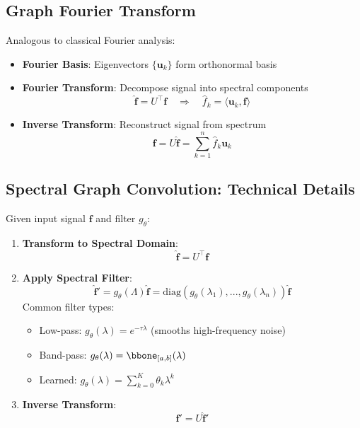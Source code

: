 \begin{notechapter}
\subsection{Graph Fourier Transform}
Analogous to classical Fourier analysis:
\begin{itemize}
    \item \textbf{Fourier Basis}: Eigenvectors $\{\mathbf{u}_k\}$ form 
        orthonormal basis
    \item \textbf{Fourier Transform}: Decompose signal into spectral components
        \[
        \hat{\mathbf{f}} = U^\top \mathbf{f} \quad \Rightarrow \quad 
        \hat{f}_k = \langle \mathbf{u}_k, \mathbf{f} \rangle
        \]
    \item \textbf{Inverse Transform}: Reconstruct signal from spectrum
        \[
        \mathbf{f} = U\hat{\mathbf{f}} = \sum_{k=1}^n \hat{f}_k \mathbf{u}_k
        \]
\end{itemize}

\subsection{Spectral Graph Convolution: Technical Details}
Given input signal $\mathbf{f}$ and filter $g_\theta$:
\begin{enumerate}
    \item \textbf{Transform to Spectral Domain}:
        \[
        \hat{\mathbf{f}} = U^\top \mathbf{f}
        \]
        
    \item \textbf{Apply Spectral Filter}:
        \[
        \hat{\mathbf{f}}' = g_\theta(\Lambda)\hat{\mathbf{f}} = 
        \text{diag}(g_\theta(\lambda_1),...,g_\theta(\lambda_n))\hat{\mathbf{f}}
        \]
        Common filter types:
        \begin{itemize}
            \item Low-pass: $g_\theta(\lambda) = e^{-\tau\lambda}$ 
                (smooths high-frequency noise)
            \item Band-pass: $g_\theta(\lambda) = \bbone_{[a,b]}(\lambda)$
            \item Learned: $g_\theta(\lambda) = \sum_{k=0}^K \theta_k \lambda^k$
        \end{itemize}
    
    \item \textbf{Inverse Transform}:
        \[
        \mathbf{f}' = U\hat{\mathbf{f}}'
        \]
\end{enumerate}


\end{notechapter}
